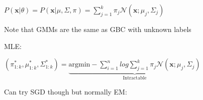 \begin{center}
    $P(\boldsymbol{x}|\theta) = P(\boldsymbol{x}|\mu, \Sigma, \pi) = \sum_{j=1}^k \pi_j \mathcal{N}(\boldsymbol{x};\mu_j,\Sigma_j)$
\end{center}
Note that GMMs are the same as GBC with unknown labels

MLE:
\begin{center}
    $(\pi_{1:k}^*,\mu_{1:k}^*,\Sigma_{1:k}^*) = \underbrace{\text{argmin}-\sum_{i=1}^n log \sum_{j=1}^k \pi_j \mathcal{N}(\boldsymbol{x};\mu_j,\Sigma_j)}_{\text{Intractable}}$

    Can try SGD though but normally EM:
\end{center}

